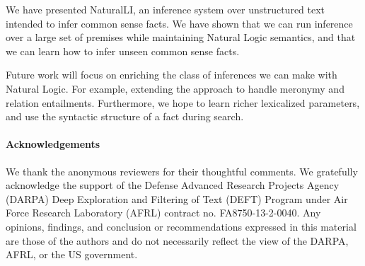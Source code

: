 We have presented NaturalLI, an inference system over
  unstructured text intended to infer common sense facts.
We have shown that we can run inference over a large set of premises
  while maintaining Natural Logic semantics, and that
  we can learn how to infer unseen common sense facts.

Future work will focus on enriching the class of inferences we can
  make with Natural Logic.
For example, extending the approach to handle meronymy and
  relation entailments.
Furthermore, we hope to learn richer lexicalized parameters,
  and use the syntactic structure of a fact during search.

\vspace{1.0ex}
{\footnotesize
\paragraph{\footnotesize Acknowledgements}
We thank the anonymous reviewers for their thoughtful comments.
We gratefully acknowledge the support of the Defense
Advanced Research Projects Agency (DARPA) Deep Exploration and Filtering
of Text (DEFT) Program under Air Force Research Laboratory (AFRL)
contract no. FA8750-13-2-0040. Any opinions, findings, and conclusion or
recommendations expressed in this material are those of the authors and
do not necessarily reflect the view of the DARPA, AFRL, or the US
government.

}
